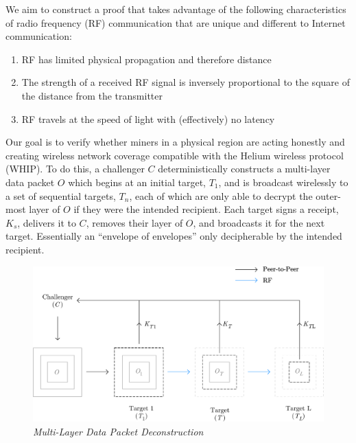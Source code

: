 \documentclass[10pt, nonatbib, nocopyrightspace, reprint]{sigplanconf}
\begin{document}
We aim to construct a proof that takes advantage of the following characteristics of radio frequency (RF) communication that are unique and different to Internet communication:

\begin{enumerate}
    \item RF has limited physical propagation and therefore distance
    \item The strength of a received RF signal is inversely proportional to the square of the distance from the transmitter
    \item RF travels at the speed of light with (effectively) no latency
\end{enumerate}

Our goal is to verify whether miners in a physical region are acting honestly and creating wireless network coverage compatible with the Helium wireless protocol (WHIP). To do this, a challenger $C$ deterministically constructs a multi-layer data packet $O$ which begins at an initial target, $T_1$, and is broadcast wirelessly to a set of sequential targets, $T_n$, each of which are only able to decrypt the outer-most layer of $O$ if they were the intended recipient. Each target signs a receipt, $K_s$, delivers it to $C$, removes their layer of $O$, and broadcasts it for the next target. Essentially an ``envelope of envelopes'' only decipherable by the intended recipient.

\begin{figure}[ht]
    \begin{center}
          \includegraphics[width=\columnwidth]{deconstruction.eps}
          \caption{\emph{Multi-Layer Data Packet Deconstruction}}
          \label{fig:poc-deconstruction}
     \end{center}
\end{figure}
\end{document}
